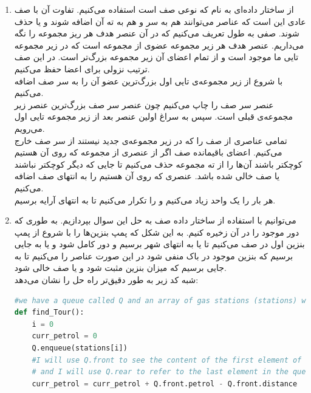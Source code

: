 \documentclass{article}
\begin{document}
\begin{enumerate}
\begin{enumerate}
	\end{enumerate}
	\item از ساختار داده‌ای به نام  که نوعی صف است استفاده می‌کنیم. تفاوت آن با صف عادی این است که عناصر می‌توانند هم به سر و هم به ته آن اضافه شوند و یا حذف شوند. صفی به طول  تعریف می‌کنیم که در آن عنصر هدف هر ریز مجموعه را نگه می‌داریم. عنصر هدف هر زیر مجموعه عضوی از مجموعه است که در زیر مجموعه  تایی ما موجود است و از تمام اعضای آن زیر مجموعه بزرگ‌تر است. در این صف ترتیب نزولی برای اعضا حفظ می‌کنیم.\\
	با شروع از زیر مجموعه‌ی  تایی اول بزرگ‌ترین عضو آن را به سر صف اضافه می‌کنیم.\\
	 عنصر سر صف را چاپ می‌کنیم چون عنصر سر صف بزرگ‌ترین عنصر زیر مجموعه‌ی قبلی است. سپس به سراغ اولین عنصر بعد از زیر مجموعه  تایی اول می‌رویم. \\
	 \lr{*} تمامی عناصری از صف را که در زیر مجموعه‌ی جدید نیستند از سر صف خارج می‌کنیم. اعضای باقیمانده صف اگر از عنصری از مجموعه که روی آن هستیم کوچکتر باشند آن‌ها را از ته مجموعه حذف می‌کنیم تا جایی که دیگر کوچکتر نباشند یا صف خالی شده باشد. عنصری که روی آن هستیم را به انتهای صف اضافه می‌کنیم. \\
	 هر بار  را یک واحد زیاد می‌کنیم و  \lr{*} را تکرار می‌کنیم تا به انتهای آرایه برسیم. 
	\item می‌توانیم با استفاده از ساختار داده صف به حل این سوال بپردازیم. به طوری که دور موجود را در آن زخیره کنیم. به این شکل که پمپ بنزین‌ها را با شروع از پمپ بنزین اول در صف  می‌کنیم تا یا به انتها‌ی شهر برسیم و دور کامل شود و یا به جایی برسیم که بنزین موجود در باک منفی شود در این صورت عناصر را  می‌کنیم تا به جایی برسیم که میزان بنزین مثبت شود و یا صف خالی شود. \\
	شبه کد زیر به طور دقیق‌تر راه حل را نشان می‌دهد:\\
\begin{latin}
\begin{flushright}				
\begin{lstlisting}[language=Python]
#we have a queue called Q and an array of gas stations (stations) which have two variables: distance and petrol 
def find_Tour():
	i = 0
	curr_petrol = 0
	Q.enqueue(stations[i])
	#I will use Q.front to see the content of the first element of the queue
	# and I will use Q.rear to refer to the last element in the queue
	curr_petrol = curr_petrol + Q.front.petrol - Q.front.distance


\end{lstlisting}
\end{flushright}
\end{latin}
\end{enumerate}
\end{document}

